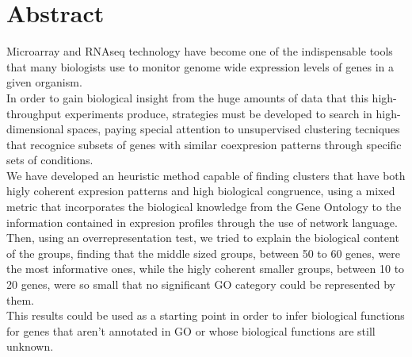 \chapter*{Abstract}
Microarray and RNAseq technology have become one of the indispensable tools that many biologists use to monitor genome wide expression levels of genes in a given organism.\\

In order to gain biological insight from the huge amounts of data that this high-throughput experiments produce, strategies must be developed to search in high-dimensional spaces, paying special attention to unsupervised clustering tecniques that recognice subsets of genes with similar coexpresion patterns through specific sets of conditions.\\

We have developed an heuristic method capable of finding clusters that have both higly coherent expresion patterns and high biological congruence, using a mixed metric that incorporates the biological knowledge from the Gene Ontology to the information contained in expresion profiles through the use of network language.\\

Then, using an overrepresentation test, we tried to explain the biological content of the groups, finding that the middle sized groups, between 50 to 60 genes, were the most informative ones, while the higly coherent smaller groups, between 10 to 20 genes, were so small that no significant GO category could be represented by them.\\

This results could be used as a starting point in order to infer biological functions for genes that aren't annotated in GO or whose biological functions are still unknown.
